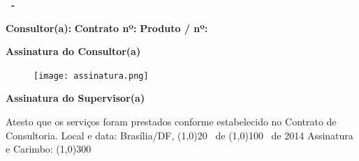 \addtolength{\topmargin}{2.5cm}
\thispagestyle{empty}

{\bf \ProjectCode \ -} \ProductDescription

\vspace{2.5cm}

\begin{minipage}{\textwidth}
  {\bf Consultor(a): \MyName}
  \newline
  {\bf Contrato nº: \ContractNumber}
  \newline
  {\bf Produto / nº: \ProductNumber}
\end{minipage}

\vspace{2cm}

{\bf Assinatura do Consultor(a)}

\begin{figure}[h]
\center
\texttt{[image: assinatura.png]}
\end{figure}


\vspace{1cm}

{\bf Assinatura do Supervisor(a)}

\begin{framed}
\noindent Atesto que os serviços foram prestados conforme estabelecido no
Contrato de Consultoria.
\newline
\newline
Local e data: Brasília/DF, \line(1,0){20} \ de \line(1,0){100} \ de 2014
\newline
\newline
Assinatura e Carimbo: \line(1,0){300}
\end{framed}

\vspace{1.5cm}

